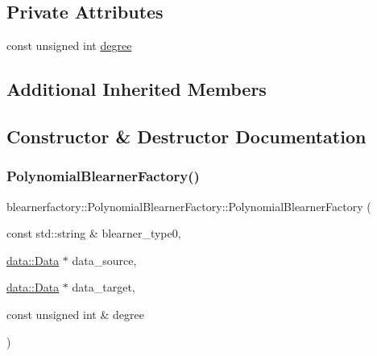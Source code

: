 \subsection*{Private Attributes}
\begin{DoxyCompactItemize}
\item 
const unsigned int \mbox{\hyperlink{classblearnerfactory_1_1_polynomial_blearner_factory_a78c1852e3f1e1b43e6d8bef40032e19f}{degree}}
\end{DoxyCompactItemize}
\subsection*{Additional Inherited Members}


\subsection{Constructor \& Destructor Documentation}
\mbox{\label{classblearnerfactory_1_1_polynomial_blearner_factory_a87a3247a9abe49009e1e951f25ed97cf}} 
\subsubsection{\texorpdfstring{Polynomial\+Blearner\+Factory()}{PolynomialBlearnerFactory()}}
{\footnotesize\ttfamily blearnerfactory\+::\+Polynomial\+Blearner\+Factory\+::\+Polynomial\+Blearner\+Factory (\begin{DoxyParamCaption}\item[{const std\+::string \&}]{blearner\+\_\+type0,  }\item[{\mbox{\hyperlink{classdata_1_1_data}{data\+::\+Data}} $\ast$}]{data\+\_\+source,  }\item[{\mbox{\hyperlink{classdata_1_1_data}{data\+::\+Data}} $\ast$}]{data\+\_\+target,  }\item[{const unsigned int \&}]{degree }\end{DoxyParamCaption})}

